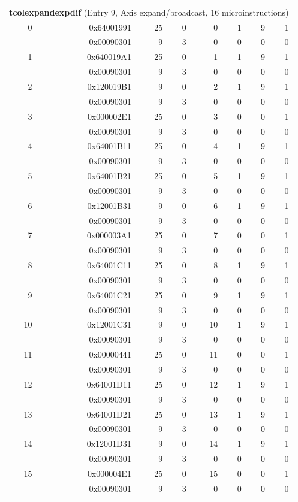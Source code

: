 \begin{longtable}{r r r r r r r r}
\multicolumn{8}{l}{\textbf{tcolexpandexpdif} (Entry 9, Axis expand/broadcast, 16 microinstructions)} \\
0 & 0x64001991 & 25 & 0 & 0 & 1 & 9 & 1 \\
  & 0x00090301 & 9 & 3 & 0 & 0 & 0 & 0 \\
1 & 0x640019A1 & 25 & 0 & 1 & 1 & 9 & 1 \\
  & 0x00090301 & 9 & 3 & 0 & 0 & 0 & 0 \\
2 & 0x120019B1 & 9 & 0 & 2 & 1 & 9 & 1 \\
  & 0x00090301 & 9 & 3 & 0 & 0 & 0 & 0 \\
3 & 0x000002E1 & 25 & 0 & 3 & 0 & 0 & 1 \\
  & 0x00090301 & 9 & 3 & 0 & 0 & 0 & 0 \\
4 & 0x64001B11 & 25 & 0 & 4 & 1 & 9 & 1 \\
  & 0x00090301 & 9 & 3 & 0 & 0 & 0 & 0 \\
5 & 0x64001B21 & 25 & 0 & 5 & 1 & 9 & 1 \\
  & 0x00090301 & 9 & 3 & 0 & 0 & 0 & 0 \\
6 & 0x12001B31 & 9 & 0 & 6 & 1 & 9 & 1 \\
  & 0x00090301 & 9 & 3 & 0 & 0 & 0 & 0 \\
7 & 0x000003A1 & 25 & 0 & 7 & 0 & 0 & 1 \\
  & 0x00090301 & 9 & 3 & 0 & 0 & 0 & 0 \\
8 & 0x64001C11 & 25 & 0 & 8 & 1 & 9 & 1 \\
  & 0x00090301 & 9 & 3 & 0 & 0 & 0 & 0 \\
9 & 0x64001C21 & 25 & 0 & 9 & 1 & 9 & 1 \\
  & 0x00090301 & 9 & 3 & 0 & 0 & 0 & 0 \\
10 & 0x12001C31 & 9 & 0 & 10 & 1 & 9 & 1 \\
  & 0x00090301 & 9 & 3 & 0 & 0 & 0 & 0 \\
11 & 0x00000441 & 25 & 0 & 11 & 0 & 0 & 1 \\
  & 0x00090301 & 9 & 3 & 0 & 0 & 0 & 0 \\
12 & 0x64001D11 & 25 & 0 & 12 & 1 & 9 & 1 \\
  & 0x00090301 & 9 & 3 & 0 & 0 & 0 & 0 \\
13 & 0x64001D21 & 25 & 0 & 13 & 1 & 9 & 1 \\
  & 0x00090301 & 9 & 3 & 0 & 0 & 0 & 0 \\
14 & 0x12001D31 & 9 & 0 & 14 & 1 & 9 & 1 \\
  & 0x00090301 & 9 & 3 & 0 & 0 & 0 & 0 \\
15 & 0x000004E1 & 25 & 0 & 15 & 0 & 0 & 1 \\
  & 0x00090301 & 9 & 3 & 0 & 0 & 0 & 0 \\


\end{longtable}
